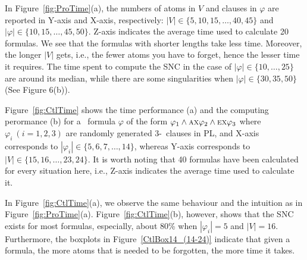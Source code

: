 \documentclass[twoside,11pt]{article}
\begin{document}
	
	In Figure~\ref{fig:ProTime}(a), the numbers of atoms in $V$ and clauses in $\varphi$ are reported in Y-axis and X-axis, respectively: $|V| \in \{5, 10, 15, \dots, 40, 45\}$ and $|\varphi| \in \{10, 15, \dots, 45, 50\}$.
	Z-axis indicates the average time used to calculate 20 formulas.
	We see that the formulas with shorter lengths take less time.
	Moreover, the longer  $|V|$ gets, i.e., the fewer atoms you have to forget, hence the lesser time it requires.
	The time spent to compute the SNC in the case of $|\varphi| \in \{10, \dots, 25\}$ are around its median, while there are some singularities when $|\varphi| \in \{30, 35, 50\}$ (See Figure 6(b)).
	
	Figure~\ref{fig:CtlTime} shows the time performance (a) and the computing perormance (b) for a \CTL\ formula $\varphi$ of the form $\varphi_1\wedge \textsc{a} \textsc{x} \varphi_2  \wedge \textsc{e} \textsc{x} \varphi_3$
	where $\varphi_i~(i=1,2,3)$ are randomly generated 3-\CNF\ clauses in PL, and X-axis corresponds to $|\varphi_i|\in \{5, 6, 7, \dots, 14\}$, whereas Y-axis corresponds to  $|V| \in \{15, 16, \dots, 23, 24\}$.
	It is worth noting that 40 formulas have been calculated for every situation here, i.e., Z-axis indicates the average time used to calculate it.
	
	In Figure~\ref{fig:CtlTime}(a), we observe the same behaviour and the intuition as in   Figure~\ref{fig:ProTime}(a).
	Figure~\ref{fig:CtlTime}(b), however, shows that the SNC  exists for most formulas, especially, about 80\% when $|\varphi_i|=5$ and $|V|=16$.
	Furthermore, the boxplots in Figure~\ref{CtlBox14_(14-24)} indicate that given a formula, the more atoms that is needed to be forgotten, the more time it takes.
	
	
	
\end{document}
